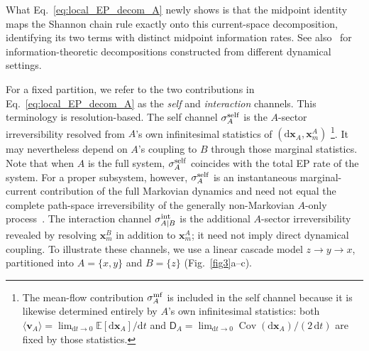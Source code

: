 \documentclass[
 longbibliography,
 twocolumn,
 superscriptaddress,
 amsmath,
 amssymb,
 amsthm,
 amsfonts,
 prl,
 floatfix,
]{revtex4-2}
\newcommand{\matbf}[1]{\boldsymbol{\mathsf{#1}}}
\begin{document}
What Eq.~\eqref{eq:local_EP_decom_A} newly shows is that the midpoint identity maps the Shannon chain rule exactly onto this current-space decomposition, identifying its two terms with distinct midpoint information rates. See also~\cite{diana2014mutual,lynn2022decomposing} for information-theoretic decompositions constructed from different dynamical settings.

For a fixed partition, we refer to the two contributions in Eq.~\eqref{eq:local_EP_decom_A} as the \textit{self} and \textit{interaction} channels.
This terminology is resolution-based. The self channel $\sigma_A^{\rm self}$ is the $A$-sector irreversibility resolved from $A$'s own infinitesimal statistics of $(\mathrm d\bm x_A,\bm x_m^A)$
\footnote{The mean-flow contribution $\sigma_A^{\rm mf}$ is included in the self channel because it is likewise determined entirely by $A$'s own infinitesimal statistics: both $\langle\bm v_A\rangle=\lim_{\mathrm dt\to0}\mathbb E[\mathrm d\bm x_A]/\mathrm dt$ and $\matbf D_A=\lim_{\mathrm dt\to0}\operatorname{Cov}(\mathrm d\bm x_A)/(2\,\mathrm dt)$ are fixed by those statistics.}.
It may nevertheless depend on $A$'s coupling to $B$ through those marginal statistics.
Note that when $A$ is the full system, $\sigma_A^{\rm self}$ coincides with the total EP rate of the system. For a proper subsystem, however, $\sigma_A^{\rm self}$ is an instantaneous marginal-current contribution of the full Markovian dynamics and need not equal the complete path-space irreversibility of the generally non-Markovian $A$-only process~\cite{kahlen2018hidden}.
The interaction channel $\sigma_{A|B}^{\rm int}$ is the additional $A$-sector irreversibility revealed by resolving $\bm x_m^B$ in addition to $\bm x_m^A$; it need not imply direct dynamical coupling.
To illustrate these channels, we use a linear cascade model $z\rightarrow y\rightarrow x$, partitioned into $A=\{x,y\}$ and $B=\{z\}$ (Fig.~\ref{fig3}a--c). 
\end{document}
